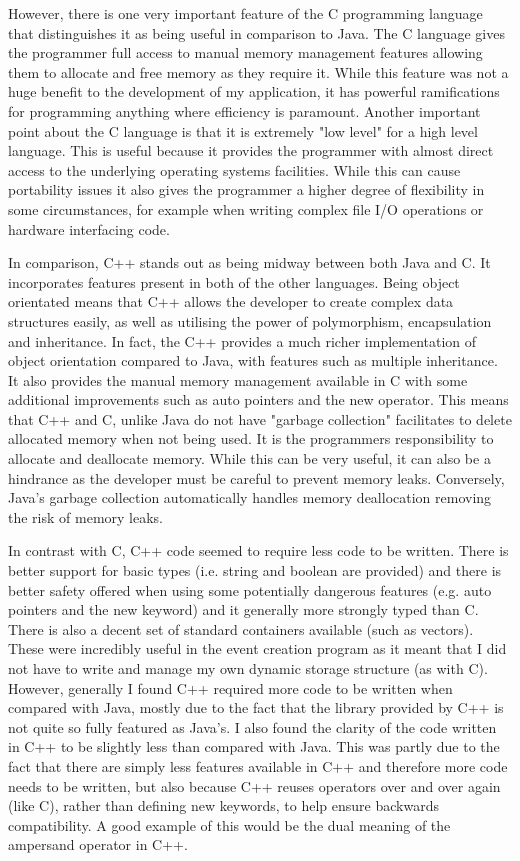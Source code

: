 \documentclass{article}
\begin{document}
However, there is one very important feature of the C programming language that distinguishes it as being useful in comparison to Java. The C language gives the programmer full access to manual memory management features allowing them to allocate and free memory as they require it. While this feature was not a huge benefit to the development of my application, it has powerful ramifications for programming anything where efficiency is paramount. Another important point about the C language is that it is extremely "low level" for a high level language. This is useful because it provides the programmer with almost direct access to the underlying operating systems facilities. While this can cause portability issues it also gives the programmer a higher degree of flexibility in some circumstances, for example when writing complex file I/O operations or hardware interfacing code.

In comparison, C++ stands out as being midway between both Java and C. It incorporates features present in both of the other languages. Being object orientated means that C++ allows the developer to create complex data structures easily, as well as utilising the power of polymorphism, encapsulation and inheritance. In fact, the C++ provides a much richer implementation of object orientation compared to Java, with features such as multiple inheritance. It also provides the manual memory management available in C with some additional improvements such as auto pointers and the new operator. This means that C++ and C, unlike Java do not have "garbage collection" facilitates to delete allocated memory when not being used. It is the programmers responsibility to allocate and deallocate memory. While this can be very useful, it can also be a hindrance as the developer must be careful to prevent memory leaks. Conversely, Java's garbage collection automatically handles memory deallocation removing the risk of memory leaks.

In contrast with C, C++ code seemed to require less code to be written. There is better support for basic types (i.e. string and boolean are provided) and there is better safety offered when using some potentially dangerous features (e.g. auto pointers and the new keyword) and it generally more strongly typed than C. There is also a decent set of standard containers available (such as vectors). These were incredibly useful in the event creation program as it meant that I did not have to write and manage my own dynamic storage structure (as with C). However, generally I found C++ required more code to be written when compared with Java, mostly due to the fact that the library provided by C++ is not quite so fully featured as Java's. I also found the clarity of the code written in C++ to be slightly less than compared with Java. This was partly due to the fact that there are simply less features available in C++ and therefore more code needs to be written, but also because C++ reuses operators over and over again (like C), rather than defining new keywords, to help ensure backwards compatibility. A good example of this would be the dual meaning of the ampersand operator in C++.
\end{document}

